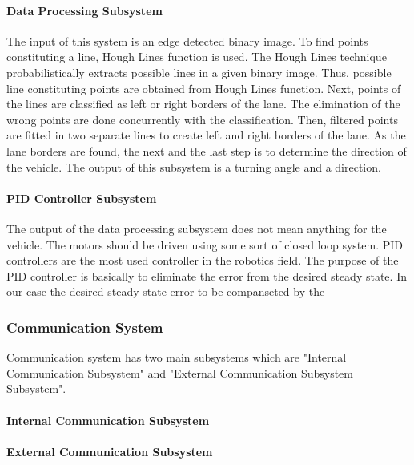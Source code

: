 \documentclass[a4paper,12pt]{article}
\begin{document}
		\paragraph{Data Processing Subsystem}
		
 The input of this system is an edge detected binary image. To find points constituting a line, Hough Lines function is used. The Hough Lines technique probabilistically extracts possible lines in a given binary image. Thus, possible line constituting points are obtained from Hough Lines function. Next, points of the lines are classified as left or right borders of the lane. The elimination of the wrong points are done concurrently with the classification. Then, filtered points are fitted in two separate lines to create left and right borders of the lane. As the lane borders are found, the next and the last step is to determine the direction of the vehicle. The output of this subsystem is a turning angle and a direction.

		\paragraph{PID Controller Subsystem}
			
			The output of the data processing subsystem does not mean anything for the vehicle. The motors should be driven using some sort of closed loop system. PID controllers are the most used controller in the robotics field. The purpose of the PID controller is basically to eliminate the error from the desired steady state. In our case the desired steady state  error to be companseted by the


	\subsubsection{Communication System}
	
		Communication system has two main subsystems which are "Internal Communication Subsystem" and "External Communication Subsystem Subsystem".
	
		\paragraph{Internal Communication Subsystem}
		
		\paragraph{External Communication Subsystem}
		
\end{document}
